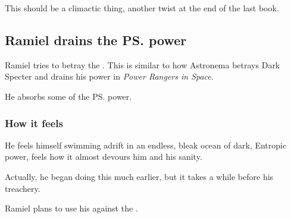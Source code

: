 This should be a climactic thing, another  twist at the end of the last book. 









\subsection{Ramiel drains the \ps{\Voidbringer}{} power}
Ramiel tries to betray the \Voidbringer. 
This is similar to how Astronema betrays Dark Specter and drains his power in \emph{Power Rangers in Space}. 

He absorbs some of the \ps{\Voidbringer}{} power. 





\subsubsection{How it feels}
He feels himself swimming adrift in an endless, bleak ocean of dark, Entropic power, feels how it almost devours him and his sanity.


Actually, he began doing this much earlier, but it takes a while before \Daggerrain{}  his treachery. 

Ramiel plans to use his \carcer against the \Voidbringer.

